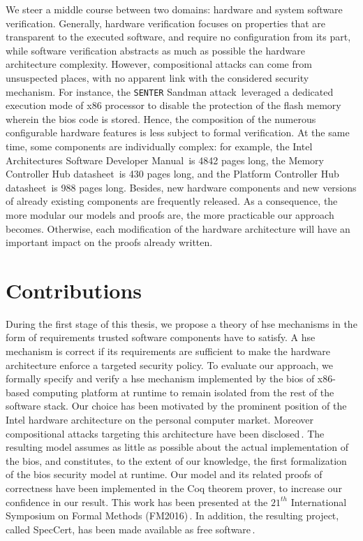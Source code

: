 We steer a middle course between two domains: hardware and system software
verification.
%
Generally, hardware verification focuses on properties that are transparent to
the executed software, and require no configuration from its part, while
software verification abstracts as much as possible the hardware architecture
complexity.
%
However, compositional attacks can come from unsuspected places, with no
apparent link with the considered security mechanism.
%
For instance, the \texttt{SENTER} Sandman attack\,\cite{kovah2015senter}
leveraged a dedicated execution mode of x86 processor to disable the protection
of the flash memory wherein the \ac{bios} code is stored.
%
Hence, the composition of the numerous configurable hardware features is less
subject to formal verification.
%
At the same time, some components are individually complex: for example, the
Intel Architectures Software Developer Manual\,\cite{intel2014manual} is 4842
pages long, the Memory Controller Hub datasheet\,\cite{intel2009mch} is 430
pages long, and the Platform Controller Hub datasheet\,\cite{intel2012pch} is
988 pages long.
%
Besides, new hardware components and new versions of already existing components
are frequently released.
%
As a consequence, the more modular our models and proofs are, the more
practicable our approach becomes.
%
Otherwise, each modification of the hardware architecture will have an important
impact on the proofs already written.

\section{Contributions}

During the first stage of this thesis, we propose a theory of \ac{hse}
mechanisms in the form of requirements trusted software components have to
satisfy.
%
A \ac{hse} mechanism is correct if its requirements are sufficient to make the
hardware architecture enforce a targeted security policy.
%
To evaluate our approach, we formally specify and verify a \ac{hse} mechanism
implemented by the \ac{bios} of x86-based computing platform at runtime to
remain isolated from the rest of the software stack.
%
Our choice has been motivated by the prominent position of the Intel hardware
architecture on the personal computer market.
%
Moreover compositional attacks targeting this architecture have been
disclosed\,\cite{duflot2009smram,wojtczuk2009smram,domas2015sinkhole,kallenberg2015racecondition,kovah2015senter}.
%
The resulting model assumes as little as possible about the actual
implementation of the \ac{bios}, and constitutes, to the extent of our
knowledge, the first formalization of the \ac{bios} security model at runtime.
%
Our model and its related proofs of correctness have been implemented in the Coq
theorem prover, to increase our confidence in our result.
%
This work has been presented at the $21^{th}$ International Symposium on Formal
Methods (FM2016)\,\cite{letan2016speccert}.
%
In addition, the resulting project, called SpecCert, has been made available as
free software\,\cite{letan2016speccertcode}.

